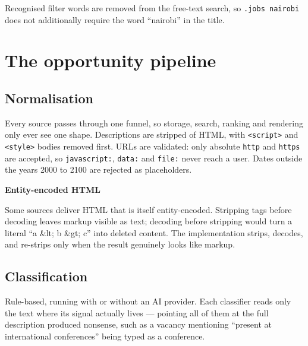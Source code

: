 \documentclass[11pt,a4paper]{report}
\newenvironment{callout}[1]
  {\begin{framed}\noindent\textbf{\textcolor{phcWarnInk}{#1}}\par\vspace{3pt}\small}
  {\end{framed}}
\newcommand{\dash}{---}
\begin{document}
Recognised filter words are removed from the free-text search, so
\texttt{.jobs nairobi} does not additionally require the word ``nairobi'' in the
title.

\chapter{The opportunity pipeline}

\section{Normalisation}

Every source passes through one funnel, so storage, search, ranking and
rendering only ever see one shape. Descriptions are stripped of HTML, with
\texttt{<script>} and \texttt{<style>} bodies removed first. URLs are validated:
only absolute \texttt{http} and \texttt{https} are accepted, so
\texttt{javascript:}, \texttt{data:} and \texttt{file:} never reach a user.
Dates outside the years 2000 to 2100 are rejected as placeholders.

\begin{callout}{Entity-encoded HTML}
Some sources deliver HTML that is itself entity-encoded. Stripping tags before
decoding leaves markup visible as text; decoding before stripping would turn a
literal ``a \&lt; b \&gt; c'' into deleted content. The implementation strips,
decodes, and re-strips only when the result genuinely looks like markup.
\end{callout}

\section{Classification}

Rule-based, running with or without an AI provider. Each classifier reads only
the text where its signal actually lives \dash{} pointing all of them at the
full description produced nonsense, such as a vacancy mentioning ``present at
international conferences'' being typed as a conference.
\end{document}
